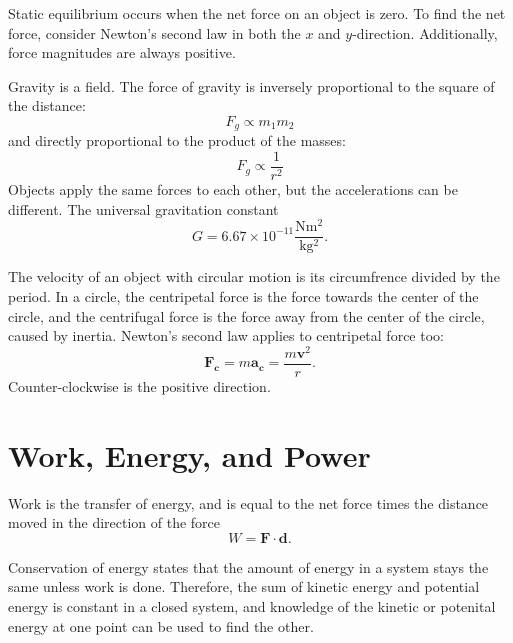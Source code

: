 \documentclass{article}
\begin{document}
Static equilibrium occurs when the net force on an object is zero.
To find the net force, consider Newton's second law in both the $x$ and $y$-direction. 
Additionally, force magnitudes are always positive. 

Gravity is a field. The force of gravity is inversely proportional to the square of the distance:
\[
F_g \propto m_1m_2 
\]
and directly proportional to the product of the masses:
\[
F_g \propto \frac{1}{r^2}
\]
Objects apply the same forces to each other, but the accelerations can be different.
The universal gravitation constant 
\[
G = 6.67 \times 10^{-11} \frac{\mathrm{Nm^2}}{\mathrm{kg^2}}.
\] 

The velocity of an object with circular motion is its circumfrence divided by the period.
In a circle, the centripetal force is the force towards the center of the circle,
and the centrifugal force is the force away from the center of the circle, caused by inertia.
Newton's second law applies to centripetal force too:
\[
\mathbf{F_c} = m\mathbf{a_c} = \frac{m\mathbf{v}^2}{r}.
\]
Counter-clockwise is the positive direction. 

\section*{Work, Energy, and Power}

Work is the transfer of energy, and is equal to the net force times the distance moved in the direction of the force
\[
W = \mathbf{F \cdot d}. 
\]

Conservation of energy states that the amount of energy in a system stays the same unless work is done. 
Therefore, the sum of kinetic energy and potential energy is constant in a closed system,
and knowledge of the kinetic or potenital energy at one point can be used to find the other.
\end{document}

